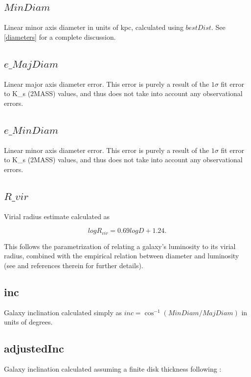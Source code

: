 \documentclass[twocolumn,tighten]{aastex62}
\begin{document}
\subsection{$MinDiam$} \label{MinDiam}
Linear minor axis diameter in units of kpc, calculated using $bestDist$. See \ref{diameters} for a complete discussion.

\subsection{$e\_MajDiam$} \label{e_MajDiam}
Linear major axis diameter error. This error is purely a result of the $1\sigma$ fit error to K\_s (2MASS) values, and thus does not take into account any observational errors.

\subsection{$e\_MinDiam$} \label{e_MinDiam}
Linear minor axis diameter error. This error is purely a result of the $1\sigma$ fit error to K\_s (2MASS) values, and thus does not take into account any observational errors.

\subsection{$R\_vir$} \label{R_vir}
Virial radius estimate calculated as

\begin{equation}
log R_{vir} = 0.69 log D + 1.24.
\end{equation}

\noindent This follows the parametrization of \cite{stocke2013} relating a galaxy's luminosity to its virial radius, combined with the \cite{wakker2009} empirical relation between diameter and luminosity (see \citealt{wakker2015} and references therein for further details).

\subsection{inc} \label{inc}
Galaxy inclination calculated simply as $inc = \cos^{-1} (MinDiam / MajDiam)$ in units of degrees.

\subsection{adjustedInc} \label{adjustedInc}
Galaxy inclination calculated assuming a finite disk thickness following \cite{heidmann1972}:
\end{document}
